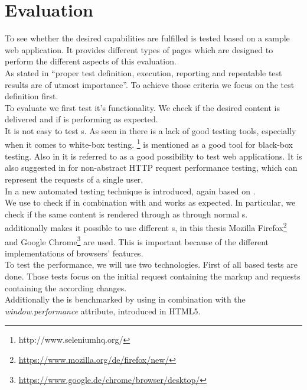 \section{Evaluation\label{chap:evaluation}}
To see whether the desired capabilities are fulfilled \lare{} is tested based on a sample web application.
It provides different types of pages which are designed to perform the different aspects of this evaluation.
\\
As stated in \cite{palomaki2010web} \enquote{proper test definition, execution, reporting and repeatable test results are of utmost importance}.
To achieve those criteria we focus on the test definition first.
\\
To evaluate \lare{} we first test it's functionality.
We check if the desired content is delivered and if \lare{} is performing as expected.
\\
It is not easy to test \ajax{} \webApplication{}s.
As seen in \cite{marchetto2007testing} there is a lack of good testing tools, especially when it comes to white-box testing.
\selenium{}\footnote{http://www.seleniumhq.org/} is mentioned as a good tool for black-box testing.
Also in \cite{lundmarkautomatic} it is referred to as a good possibility to test web applications.
It is also suggested in \cite{palomaki2010web} for non-abstract HTTP request performance testing, which can represent the requests of a single user.
\\
In \cite{marchetto2008state} a new automated testing technique is introduced, again based on \selenium{}.
\\
We use \selenium{} to check if \phpLare{} in combination with \twigLare{} and \lareJS{} works as expected.
In particular, we check if the same content is rendered through \lare{} as through normal \httpRequest{}s.
\\
\selenium{} additionally makes it possible to use different \webdriver{}s, in this thesis Mozilla Firefox\footnote{\url{https://www.mozilla.org/de/firefox/new/}} and Google Chrome\footnote{\url{https://www.google.de/chrome/browser/desktop/}} are used.
This is important because of the different implementations of browsers' features.
\\
To test the performance, we will use two technologies.
First of all \curl{} based tests are done.
Those tests focus on the initial request containing the markup and \lare{} requests containing the according changes.
\\
Additionally the \webApplication{} is benchmarked by using \selenium{} in combination with the \emph{window.performance} attribute, introduced in HTML5.
